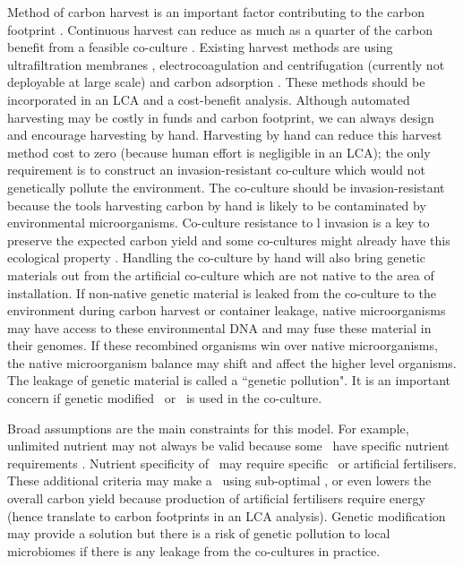 \documentclass[../thesis.tex]{subfiles} %
\begin{document}
Method of carbon harvest is an important factor contributing to the carbon footprint \autocite{fuentes2016impact}.  Continuous harvest can reduce as much as a quarter of the carbon benefit from a feasible co-culture \autocite{mata2010microalgae}.  Existing harvest methods are using ultrafiltration membranes \autocite{zhang2010harvesting}, electrocoagulation and centrifugation (currently not deployable at large scale) \autocite{wijffels2010outlook} and carbon adsorption \autocite{mata2010microalgae,wang2012novel,lee2014repeated}.  These methods should be incorporated in an LCA and a cost-benefit analysis.  Although automated harvesting may be costly in funds and carbon footprint, we can always design and encourage harvesting by hand.  Harvesting by hand can reduce this harvest method cost to zero (because human effort is negligible in an LCA); the only requirement is to construct an invasion-resistant co-culture which would not genetically pollute the environment.  The co-culture should be invasion-resistant because the tools harvesting carbon by hand is likely to be contaminated by environmental microorganisms.  Co-culture resistance to \bac l invasion is a key to preserve the expected carbon yield and some co-cultures might already have this ecological property \autocite{fuentes2016impact,seyedsayamdost2011roseobacticides}.  Handling the co-culture by hand will also bring genetic materials out from the artificial co-culture which are not native to the area of installation.  If non-native genetic material is leaked from the co-culture to the environment during carbon harvest or container leakage, native microorganisms may have access to these environmental DNA and may fuse these material in their genomes.  If these recombined organisms win over native microorganisms, the native microorganism balance may shift and affect the higher level organisms.  The leakage of genetic material is called a ``genetic pollution".  It is an important concern if genetic modified \phy\ or \bac\ is used in the co-culture.

Broad assumptions are the main constraints for this model.  For example, unlimited nutrient may not always be valid because some \phy\ have specific nutrient requirements \autocite{kazamia2012mutualistic}.  Nutrient specificity of \phy\ may require specific \bacm\ or artificial fertilisers.  These additional criteria may make a \pbs\ using sub-optimal \bac, or even lowers the overall carbon yield because production of artificial fertilisers require energy (hence translate to carbon footprints in an LCA analysis).  Genetic modification may provide a solution but there is a risk of genetic pollution to local microbiomes if there is any leakage from the co-cultures in practice.
\end{document}
